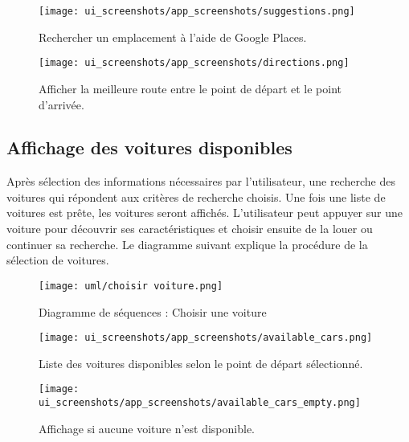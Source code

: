 \newpage
\begin{multicols}{2}
    \begin{figure}[H]
        \centering
        \texttt{[image: ui\_screenshots/app\_screenshots/suggestions.png]}
        \captionsetup{justification=centering}
        \caption{Rechercher un emplacement à l'aide de Google Places.}
        \label{fig:app_transfer_suggestions}
    \end{figure}
    \begin{figure}[H]
        \centering
        \texttt{[image: ui\_screenshots/app\_screenshots/directions.png]}
        \captionsetup{justification=centering}
        \caption{Afficher la meilleure route entre le point de départ et le point d'arrivée.}
        \label{fig:app_transfer_directions}
    \end{figure}
\end{multicols}
\subsection{Affichage des voitures disponibles}
Après sélection des informations nécessaires par l'utilisateur, une recherche des voitures qui répondent aux critères de recherche choisis. Une fois une liste de voitures est prête, les voitures seront affichés. L'utilisateur peut appuyer sur une voiture pour découvrir ses caractéristiques et choisir ensuite de la louer ou continuer sa recherche.
Le diagramme suivant explique la procédure de la sélection de voitures.
\vspace{1cm}
\begin{figure}[H]
    \centering
    \texttt{[image: uml/choisir voiture.png]}
    \vspace{1cm}
    \caption{Diagramme de séquences : Choisir une voiture}
    \label{fig:seq_car_select}
\end{figure}
\newpage
\begin{multicols}{2}
    \begin{figure}[H]
        \centering
        \texttt{[image: ui\_screenshots/app\_screenshots/available\_cars.png]}
        \captionsetup{justification=centering}
        \caption{Liste des voitures disponibles selon le point de départ sélectionné.}
        \label{fig:app_available_cars}
    \end{figure}
    \begin{figure}[H]
        \centering
        \texttt{[image: ui\_screenshots/app\_screenshots/available\_cars\_empty.png]}
        \captionsetup{justification=centering}
        \caption{Affichage si aucune voiture n'est disponible.}
        \label{fig:app_available_cars_empty}
    \end{figure}
\end{multicols}
